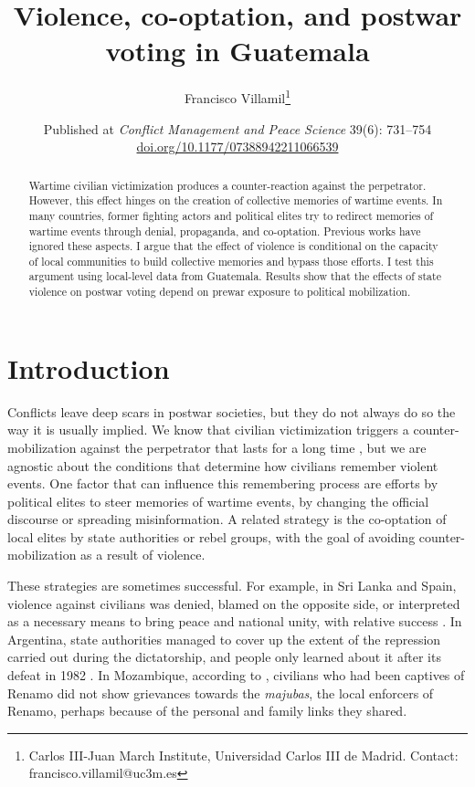 \documentclass[12pt, notitlepage]{article}
\title{\Large Violence, co-optation, and postwar voting in Guatemala}
\author{Francisco Villamil\footnote{Carlos III-Juan March Institute, Universidad Carlos III de Madrid. Contact: francisco.villamil@uc3m.es}}
\date{Published at \textit{Conflict Management and Peace Science} 39(6): 731--754\\\href{https://doi.org/10.1177/07388942211066539}{doi.org/10.1177/07388942211066539}}%
\begin{document}
\maketitle
\thispagestyle{empty}

\vspace{30pt}

\begin{abstract}

Wartime civilian victimization produces a counter-reaction against the perpetrator. However, this effect hinges on the creation of collective memories of wartime events. In many countries, former fighting actors and political elites try to redirect memories of wartime events through denial, propaganda, and co-optation. Previous works have ignored these aspects. I argue that the effect of violence is conditional on the capacity of local communities to build collective memories and bypass those efforts. I test this argument using local-level data from Guatemala. Results show that the effects of state violence on postwar voting depend on prewar exposure to political mobilization.

\end{abstract}

\newpage
\setcounter{page}{1}

\section*{Introduction}

Conflicts leave deep scars in postwar societies, but they do not always do so the way it is usually implied.
We know that civilian victimization triggers a counter-mobilization against the perpetrator that lasts for a long time \citep{Balcells:2012aa, Lupu:2017aa, Fontana:2017aa, Rozenas:2017aa, Rozenas:2019aa}, but we are agnostic about the conditions that determine how civilians remember violent events.
One factor that can influence this remembering process are efforts by political elites to steer memories of wartime events, by changing the official discourse or spreading misinformation.
A related strategy is the co-optation of local elites by state authorities or rebel groups, with the goal of avoiding counter-mobilization as a result of violence.

These strategies are sometimes successful.
For example, in Sri Lanka and Spain, violence against civilians was denied, blamed on the opposite side, or interpreted as a necessary means to bring peace and national unity, with relative success \citep{Seoighe:2017aa, Palomares:2004aa}.
In Argentina, state authorities managed to cover up the extent of the repression carried out during the dictatorship, and people only learned about it after its defeat in 1982 \citep{Robben:1995aa}.
In Mozambique, according to \citet{Finnegan:1992aa}, civilians who had been captives of Renamo did not show grievances towards the \textit{majubas}, the local enforcers of Renamo, perhaps because of the personal and family links they shared.
\end{document}

